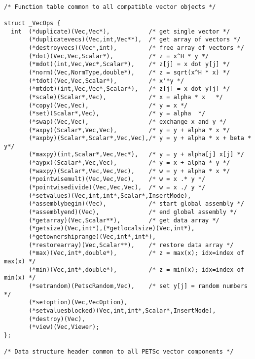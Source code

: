 \begin{verbatim}

/* Function table common to all compatible vector objects */

struct _VecOps {
  int  (*duplicate)(Vec,Vec*),           /* get single vector */
       (*duplicatevecs)(Vec,int,Vec**),  /* get array of vectors */
       (*destroyvecs)(Vec*,int),         /* free array of vectors */
       (*dot)(Vec,Vec,Scalar*),          /* z = x^H * y */
       (*mdot)(int,Vec,Vec*,Scalar*),    /* z[j] = x dot y[j] */
       (*norm)(Vec,NormType,double*),    /* z = sqrt(x^H * x) */
       (*tdot)(Vec,Vec,Scalar*),         /* x'*y */
       (*mtdot)(int,Vec,Vec*,Scalar*),   /* z[j] = x dot y[j] */
       (*scale)(Scalar*,Vec),            /* x = alpha * x   */
       (*copy)(Vec,Vec),                 /* y = x */
       (*set)(Scalar*,Vec),              /* y = alpha  */
       (*swap)(Vec,Vec),                 /* exchange x and y */
       (*axpy)(Scalar*,Vec,Vec),         /* y = y + alpha * x */
       (*axpby)(Scalar*,Scalar*,Vec,Vec),/* y = y + alpha * x + beta * y*/
       (*maxpy)(int,Scalar*,Vec,Vec*),   /* y = y + alpha[j] x[j] */
       (*aypx)(Scalar*,Vec,Vec),         /* y = x + alpha * y */
       (*waxpy)(Scalar*,Vec,Vec,Vec),    /* w = y + alpha * x */
       (*pointwisemult)(Vec,Vec,Vec),    /* w = x .* y */
       (*pointwisedivide)(Vec,Vec,Vec),  /* w = x ./ y */
       (*setvalues)(Vec,int,int*,Scalar*,InsertMode),
       (*assemblybegin)(Vec),            /* start global assembly */
       (*assemblyend)(Vec),              /* end global assembly */
       (*getarray)(Vec,Scalar**),        /* get data array */
       (*getsize)(Vec,int*),(*getlocalsize)(Vec,int*),
       (*getownershiprange)(Vec,int*,int*),
       (*restorearray)(Vec,Scalar**),    /* restore data array */
       (*max)(Vec,int*,double*),         /* z = max(x); idx=index of max(x) */
       (*min)(Vec,int*,double*),         /* z = min(x); idx=index of min(x) */
       (*setrandom)(PetscRandom,Vec),    /* set y[j] = random numbers */
       (*setoption)(Vec,VecOption),
       (*setvaluesblocked)(Vec,int,int*,Scalar*,InsertMode),
       (*destroy)(Vec),
       (*view)(Vec,Viewer);
};

/* Data structure header common to all PETSc vector components */


\end{verbatim}
